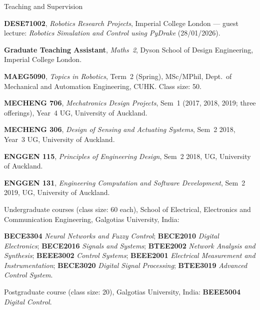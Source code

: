 
\begin{rubric}{Teaching and Supervision}


    \entry*[Jan 2026]%
        \textbf{DESE71002}, \textit{Robotics Research Projects}, Imperial College London --- guest lecture: \textit{Robotics Simulation and Control using PyDrake} (28/01/2026).

    \entry*[Autumn 2026]%
        \textbf{Graduate Teaching Assistant}, \textit{Maths~2}, Dyson School of Design Engineering, Imperial College London.

    \entry*[Spring 2026]%
        \textbf{MAEG5090}, \textit{Topics in Robotics}, Term~2 (Spring), MSc/MPhil, Dept.\ of Mechanical and Automation Engineering, CUHK. Class size: 50.

    \entry*[2017--2019]%
        \textbf{MECHENG 706}, \textit{Mechatronics Design Projects}, Sem~1 (2017, 2018, 2019; three offerings), Year~4 UG, University of Auckland.

    \entry*[Sem 2, 2018]%
        \textbf{MECHENG 306}, \textit{Design of Sensing and Actuating Systems}, Sem~2 2018, Year~3 UG, University of Auckland.

    \entry*[Sem 2, 2018]%
        \textbf{ENGGEN 115}, \textit{Principles of Engineering Design}, Sem~2 2018, UG, University of Auckland.

    \entry*[Sem 2, 2019]%
        \textbf{ENGGEN 131}, \textit{Engineering Computation and Software Development}, Sem~2 2019, UG, University of Auckland.

    \entry*[2013 -- 2016]%
        Undergraduate courses (class size: 60 each), School of Electrical, Electronics and Communication Engineering, Galgotias University, India:
        \par \textbf{BECE3304} \textit{Neural Networks and Fuzzy Control};
        \textbf{BECE2010} \textit{Digital Electronics};
        \textbf{BECE2016} \textit{Signals and Systems};
        \textbf{BTEE2002} \textit{Network Analysis and Synthesis};
        \textbf{BEEE3002} \textit{Control Systems};
        \textbf{BEEE2001} \textit{Electrical Measurement and Instrumentation};
        \textbf{BECE3020} \textit{Digital Signal Processing};
        \textbf{BTEE3019} \textit{Advanced Control System}.

    \entry*[2013 -- 2016]%
        Postgraduate course (class size: 20), Galgotias University, India: \textbf{BEEE5004} \textit{Digital Control}.



\end{rubric}
